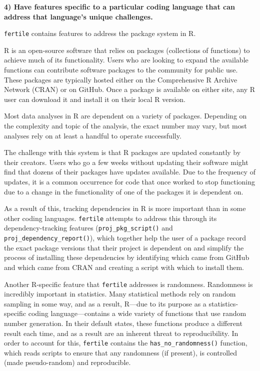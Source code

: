 \documentclass[12pt,twoside]{reedthesis}
\begin{document}
\textbf{4) Have features specific to a particular coding language that can address that language's unique challenges.}

\texttt{fertile} contains features to address the package system in R.

R is an open-source software that relies on packages (collections of functions) to achieve much of its functionality. Users who are looking to expand the available functions can contribute software packages to the community for public use. These packages are typically hosted either on the Comprehensive R Archive Network (CRAN) or on GitHub. Once a package is available on either site, any R user can download it and install it on their local R version.

Most data analyses in R are dependent on a variety of packages. Depending on the complexity and topic of the analysis, the exact number may vary, but most analyses rely on at least a handful to operate successfully.

The challenge with this system is that R packages are updated constantly by their creators. Users who go a few weeks without updating their software might find that dozens of their packages have updates available. Due to the frequency of updates, it is a common occurrence for code that once worked to stop functioning due to a change in the functionality of one of the packages it is dependent on.

As a result of this, tracking dependencies in R is more important than in some other coding languages. \texttt{fertile} attempts to address this through its dependency-tracking features (\texttt{proj\_pkg\_script()} and \texttt{proj\_dependency\_report()}), which together help the user of a package record the exact package versions that their project is dependent on and simplify the process of installing these dependencies by identifying which came from GitHub and which came from CRAN and creating a script with which to install them.

Another R-specific feature that \texttt{fertile} addresses is randomness. Randomness is incredibly important in statistics. Many statistical methods rely on random sampling in some way, and as a result, R---due to its purpose as a statistics-specific coding language---contains a wide variety of functions that use random number generation. In their default states, these functions produce a different result each time, and as a result are an inherent threat to reproducibility. In order to account for this, \texttt{fertile} contains the \texttt{has\_no\_randomness()} function, which reads scripts to ensure that any randomness (if present), is controlled (made pseudo-random) and reproducible.
\end{document}
